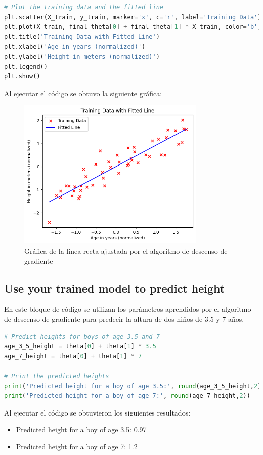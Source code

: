 \documentclass{article}
\begin{document}
    \begin{lstlisting}[language=Python, caption={Gráfica de la línea recta ajustada por el algoritmo de descenso de gradiente},label={lst:PlotStraightLineFit}]
# Plot the training data and the fitted line
plt.scatter(X_train, y_train, marker='x', c='r', label='Training Data')
plt.plot(X_train, final_theta[0] + final_theta[1] * X_train, color='b', label='Fitted Line')
plt.title('Training Data with Fitted Line')
plt.xlabel('Age in years (normalized)')
plt.ylabel('Height in meters (normalized)')
plt.legend()
plt.show()
    \end{lstlisting}
    \noindent
    Al ejecutar el código se obtuvo la siguiente gráfica:
    \begin{figure}[h]
        \centering
        \includegraphics[width=0.8\textwidth]{img/plot_straight_line_fit}
        \caption{Gráfica de la línea recta ajustada por el algoritmo de descenso de gradiente}
        \label{fig:plot_straight_line_fit}
    \end{figure}
    \clearpage

    \subsection{Use your trained model to predict height   }\label{ssec:Predict-Height}
    En este bloque de código se utilizan los parámetros aprendidos por el algoritmo de descenso de gradiente para predecir la altura de dos niños de 3.5 y 7 años.
    \begin{lstlisting}[language=Python, caption={Predicción de la altura de dos niños de 3.5 y 7 años},label={lst:PredictHeight}]
# Predict heights for boys of age 3.5 and 7
age_3_5_height = theta[0] + theta[1] * 3.5
age_7_height = theta[0] + theta[1] * 7

# Print the predicted heights
print('Predicted height for a boy of age 3.5:', round(age_3_5_height,2))
print('Predicted height for a boy of age 7:', round(age_7_height,2))
    \end{lstlisting}
    \noindent
    Al ejecutar el código se obtuvieron los siguientes resultados:
    \begin{itemize}
        \item Predicted height for a boy of age 3.5: 0.97
        \item Predicted height for a boy of age 7: 1.2
    \end{itemize}
\end{document}
